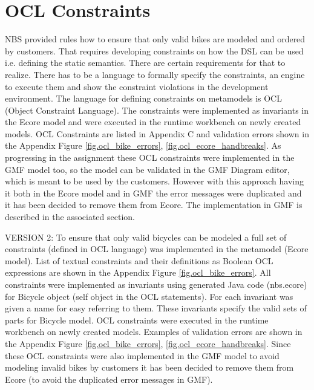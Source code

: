 \section{OCL Constraints}
\label{sec.ocl_constraints}

\noindent NBS provided rules how to ensure that only valid bikes are modeled and
ordered by customers. That requires developing constraints on how the DSL can be
used i.e. defining the static semantics. There are certain requirements for that
to realize. There has to be a language to formally specify the constraints, an
engine to execute them and show the constraint violations in the development
environment. The language for defining constraints on metamodels is OCL (Object
Constraint Language). \noindent The constraints were implemented as invariants
in the Ecore model and were executed in the runtime workbench on newly created
models. OCL Constraints are listed in Appendix C and validation errors shown in
the Appendix Figure \ref{fig.ocl_bike_errors}, \ref{fig.ocl_ecore_handbreaks}.
\noindent As progressing in the assignment these OCL constraints were
implemented in the GMF model too, so the model can be validated in the GMF
Diagram editor, which is meant to be used by the customers. However with this
approach having it both in the Ecore model and in GMF the error messages were
duplicated and it has been decided to remove them from Ecore. The implementation
in GMF is described in the associated section.

\noindent VERSION 2: To ensure that only valid bicycles can be modeled a full
set of constraints (defined in OCL language) was implemented in the metamodel
(Ecore model). List of textual constraints and their definitions as Boolean OCL
expressions are shown in the Appendix Figure \ref{fig.ocl_bike_errors}.  All
constraints were implemented as invariants using generated Java code (nbs.ecore)
for Bicycle object (self object in the OCL statements). For each invariant was
given a name for easy referring to them. These invariants specify the valid sets
of parts for Bicycle model. OCL constraints were executed in the runtime
workbench on newly created models. Examples of validation errors are shown in
the Appendix Figure \ref{fig.ocl_bike_errors}, \ref{fig.ocl_ecore_handbreaks}.
Since these OCL constraints were also implemented in the GMF model to avoid
modeling invalid bikes by customers it has been decided to remove them from
Ecore (to avoid the duplicated error messages in GMF).

